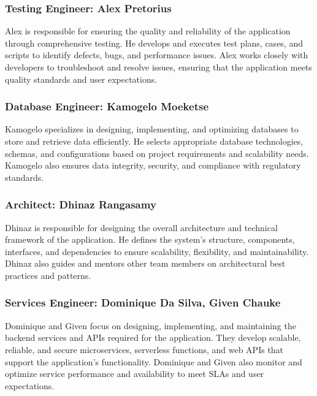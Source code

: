 \documentclass{article}
\begin{document}
\begin{itemsize}
\subsubsection{Testing Engineer: Alex Pretorius}
Alex is responsible for ensuring the quality and reliability of the application through comprehensive testing. He develops and executes test plans, cases, and scripts to identify defects, bugs, and performance issues. Alex works closely with developers to troubleshoot and resolve issues, ensuring that the application meets quality standards and user expectations.
\subsubsection{Database Engineer: Kamogelo Moeketse}
Kamogelo specializes in designing, implementing, and optimizing databases to store and retrieve data efficiently. He selects appropriate database technologies, schemas, and configurations based on project requirements and scalability needs. Kamogelo also ensures data integrity, security, and compliance with regulatory standards.
\subsubsection{Architect: Dhinaz Rangasamy}
Dhinaz is responsible for designing the overall architecture and technical framework of the application. He defines the system's structure, components, interfaces, and dependencies to ensure scalability, flexibility, and maintainability. Dhinaz also guides and mentors other team members on architectural best practices and patterns.
\subsubsection{Services Engineer: Dominique Da Silva, Given Chauke}
Dominique and Given focus on designing, implementing, and maintaining the backend services and APIs required for the application. They develop scalable, reliable, and secure microservices, serverless functions, and web APIs that support the application's functionality. Dominique and Given also monitor and optimize service performance and availability to meet SLAs and user expectations.


\end{itemsize}
\end{document}
